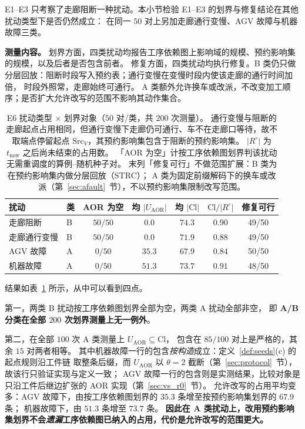 \documentclass[manuscript,screen,review]{acmart}
\providecommand{\STRC}{\textsc{STRC}}
\newcommand{\NPairs}{50}
\newcommand{\StrictlyLarger}{85/100}
\newcommand{\FeasESixBlock}{49/\NPairs}
\newcommand{\FeasSlow}{49/\NPairs}
\newcommand{\FeasESixAgv}{\NPairs/\NPairs}
\newcommand{\FeasESixRa}{48/\NPairs}
\begin{document}
E1--E3 只考察了走廊阻断一种扰动。本小节检验 E1--E3 的划界与修复结论在其他扰动类型下是否仍然成立：
在同一 \(\NPairs\) 对上另加走廊通行变慢、AGV 故障与机器故障三类。

\textbf{测量内容。} 划界方面，四类扰动均报告工序依赖图上影响域的规模、预约影响集的规模，以及后者是否包含前者。
修复方面，四类扰动均执行修复。B 类仍只做分层回放：阻断时段写入预约表；通行变慢在变慢时段内使该走廊的通行时间加倍，
时段外照常，走廊始终可通行。
A 类额外允许换车或改派，不改变加工顺序；是否扩大允许改写的范围不影响其动作集合。

\begin{table}[t]
\centering
\caption{E6 扰动类型 \(\times\) 划界对象（\(\NPairs\) 对/类，共 \(200\) 次测量）。
通行变慢与阻断的走廊起点占用相同，但通行变慢下走廊仍可通行、车不在走廊口等待，故不取端点停留起点 \(\mathrm{Src}_V\)，其预约影响集包含于阻断的预约影响集。
\(|R^{\circ}|\) 为 \(t_{\mathrm{now}}\) 之后尚未结束的占用数。
「AOR 为空」计按工序依赖图划界判该扰动无需重调度的算例--随机种子对。
末列「修复可行」不做范围扩展：B 类为在预约影响集内做分层回放（\STRC{}）；
A 类为固定前缀解码下的换车或改派（第~\ref{sec:afault}~节），不以预约影响集限制改写范围。}
\label{tab:e6}
\small
\begin{tabular}{@{}llccccc@{}}
\toprule
扰动 & 类 & AOR 为空 & 均 \(|U_{\mathrm{AOR}}|\) & 均 \(|\mathrm{Cl}|\)
 & \(\mathrm{Cl}/|R^{\circ}|\) & 修复可行 \\
\midrule
走廊阻断   & B & \(50/50\) & \(0.0\)  & \(74.3\) & \(0.90\) & \FeasESixBlock \\
走廊通行变慢 & B & \(50/50\) & \(0.0\)  & \(71.9\) & \(0.88\) & \FeasSlow \\
AGV 故障   & A & \(0/50\)  & \(35.3\) & \(67.9\) & \(0.84\) & \FeasESixAgv \\
机器故障 & A & \(0/50\)  & \(51.3\) & \(73.7\) & \(0.91\) & \FeasESixRa \\
\bottomrule
\end{tabular}
\end{table}

结果如表~\ref{tab:e6} 所示，从中可以看到四点。

第一，两类 B 扰动按工序依赖图划界全部为空，两类 A 扰动全部非空，
即 \textbf{A/B 分类在全部 \(200\) 次划界测量上无一例外}。

第二，在全部 \(100\) 次 A 类测量上 \(U_{\mathrm{AOR}}\subseteq\mathrm{Cl}\)，
包含在 \(\StrictlyLarger\) 对上是严格的，其余 \(15\) 对两者相等。
其中机器故障一行的包含\emph{按构造}成立：定义~\ref{def:seeds}(c) 的起点规则沿工件链
取整条后缀，而 \(U_{\mathrm{AOR}}\) 以 \(\theta=2\) 截断（第~\ref{sec:protocol}~节），故该行只验证实现与定义一致；
AGV 故障一行的包含则是实测结果，比较对象是只沿工件后继边扩张的 AOR 实现（第~\ref{sec:vs_r0}~节）。
允许改写的占用平均变多：AGV 故障下，由按工序依赖图划界的 \(35.3\) 条增至按预约影响集划界的 \(67.9\) 条；
机器故障下，由 \(51.3\) 条增至 \(73.7\) 条。
\textbf{因此在 A 类扰动上，改用预约影响集划界不会\emph{遗漏}工序依赖图已纳入的占用，代价是允许改写的范围更大。}
\end{document}
